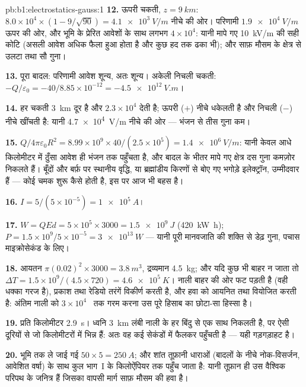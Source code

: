 \begin{solution}{pb:b1:electrostatics-gauss:1}
\textbf{12.} ऊपरी चकती, $z = \qty{9}{km}$: $8.0 \times 10^4 \times (1 - 9/\sqrt{90}) =
\qty{4.1e3}{V/m}$ नीचे की ओर। परिणामी $\qty{1.9e4}{V/m}$ ऊपर की ओर, और भूमि
के प्रेरित आवेशों के साथ लगभग $4 \times 10^4$: यानी मापे गए \qty{10}{kV/m} की
सही कोटि (असली आवेश अधिक फैला हुआ होता है और कुछ हद तक ढका भी);
और साफ़ मौसम के क्षेत्र से उलटा तथा सौ गुना।

\textbf{13.} पूरा बादल: परिणामी आवेश शून्य, अतः  शून्य। अकेली निचली
चकती: $-Q/\varepsilon_0 = -40/8.85 \times 10^{-12} = \qty{-4.5e12}{V.m}$।

\textbf{14.} हर चकती \qty{3}{km} दूर है और $2.3 \times 10^4$ देती है; ऊपरी
($+$) नीचे धकेलती है और निचली ($-$) नीचे खींचती है: यानी \qty{4.7e4}{V/m}
नीचे की ओर --- भंजन से तीस गुना कम।

\textbf{15.} $Q/4\pi\varepsilon_0R^2 = 8.99 \times 10^9 \times 40/(2.5 \times 10^5) =
\qty{1.4e6}{V/m}$: यानी केवल आधे किलोमीटर में ठुँसा आवेश ही भंजन तक पहुँचता
है, और बादल के भीतर मापे गए क्षेत्र दस गुना कमज़ोर निकलते हैं। बूँदों और
बर्फ़ पर स्थानीय वृद्धि, या ब्रह्मांडीय किरणों से बोए गए भगोड़े इलेक्ट्रॉन,
उम्मीदवार हैं --- कोई चमक शुरू कैसे होती है, इस पर आज भी बहस है।

\textbf{16.} $I = 5/(5 \times 10^{-5}) = \qty{1e5}{A}$।

\textbf{17.} $W = QEd = 5 \times 10^5 \times 3000 = \qty{1.5e9}{J}$ (\qty{420}{kW h});
$P = 1.5 \times 10^9/5 \times 10^{-5} = \qty{3e13}{W}$ --- यानी पूरी मानवजाति की
शक्ति से डेढ़ गुना, पचास माइक्रोसेकंड के लिए।

\textbf{18.} आयतन $\pi(0.02)^2 \times 3000 = \qty{3.8}{m^3}$, द्रव्यमान \qty{4.5}{kg};
और यदि कुछ भी बाहर न जाता तो $\Delta T = 1.5 \times 10^9/(4.5 \times 720) = \qty{4.6e5}{K}$।
नाली बाहर की ओर फट पड़ती है (वही धक्का गरज है), प्रकाश तथा रेडियो तरंगें
विकीर्ण करती है, और हवा को आयनित तथा वियोजित करती है: अंतिम नाली को
$3 \times 10^4$~ तक गरम करना उस पूरे हिसाब का छोटा-सा हिस्सा है।

\textbf{19.} प्रति किलोमीटर \qty{2.9}{s}। ध्वनि \qty{3}{km} लंबी नाली के हर
बिंदु से एक साथ निकलती है, पर ऐसी दूरियों से जो किलोमीटरों में भिन्न हैं:
अतः वह कई सेकंडों में फैलकर पहुँचती है --- यही गड़गड़ाहट है।

\textbf{20.} भूमि तक ले जाई गई $50 \times 5 = \qty{250}{A}$; और शांत तूफ़ानी
धाराओं (बादलों के नीचे नोक-विसर्जन, आवेशित वर्षा) के साथ कुल भाग~I के
किलोऐंपियर तक पहुँच जाता है: यानी तूफ़ान ही उस वैश्विक परिपथ के जनित्र हैं
जिसका वापसी मार्ग साफ़ मौसम की हवा है।


\end{solution}
